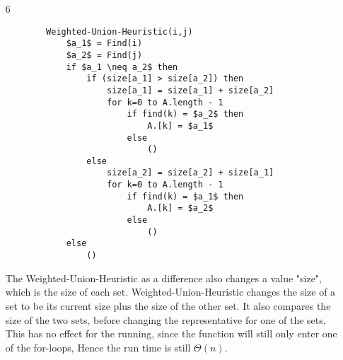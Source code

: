 \documentclass[a4paper]{article}
\begin{document}
\begin{itemize}[label=(\arabic*)]
    \item[6] 
        \begin{lstlisting}
        Weighted-Union-Heuristic(i,j)
            $a_1$ = Find(i)
            $a_2$ = Find(j)
            if $a_1 \neq a_2$ then
                if (size[a_1] > size[a_2]) then
                    size[a_1] = size[a_1] + size[a_2]
                    for k=0 to A.length - 1
                        if find(k) = $a_2$ then
                            A.[k] = $a_1$
                        else
                            ()
                else
                    size[a_2] = size[a_2] + size[a_1]
                    for k=0 to A.length - 1
                        if find(k) = $a_1$ then
                            A.[k] = $a_2$
                        else
                            ()
            else
                ()
        \end{lstlisting}    
        The Weighted-Union-Heuristic as a difference also changes a value "size", which is the size of each set. Weighted-Union-Heuristic
        changes the size of a set to be its current size plus the size of the other set. It also compares the size of the two sets, before
        changing the representative for one of the sets. This has no effect for the running, since the function will still only enter
        one of the for-loops, Hence the run time is still $\Theta(n)$.
\end{itemize}
\end{document}
